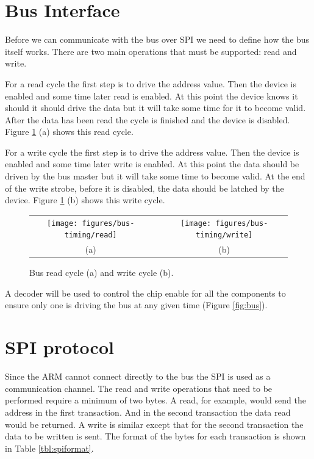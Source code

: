 \documentclass{article}
\begin{document}

\section{Bus Interface}
\label{sec:bus}

Before we can communicate with the bus over SPI we need
to define how the bus itself works.
There are two main operations that must be supported: read and write.

For a read cycle the first step is to drive the address value.
Then the device is enabled and some time later read is enabled.
At this point the device knows it should it should drive the
data but it will take some time for it to become valid.
After the data has been read the cycle is finished and the device is disabled.
Figure \ref{fig:bus_cycle} (a) shows this read cycle.

For a write cycle the first step is to drive the address value.
Then the device is enabled and some time later write is enabled.
At this point the data should be driven by the bus master
but it will take some time to become valid.
At the end of the write strobe, before it is disabled,
the data should be latched by the device.
Figure \ref{fig:bus_cycle} (b) shows this write cycle.

\begin{figure}
\center

\begin{tabular}{ccc}
\texttt{[image: figures/bus-timing/read]} & \quad &
\texttt{[image: figures/bus-timing/write]} \\
(a) && (b) 
\end{tabular}

\caption{Bus read cycle (a) and write cycle (b).}
\label{fig:bus_cycle}
\end{figure}

A decoder will be used to control the chip enable for all the components
to ensure only one is driving the bus at any given time (Figure \ref{fig:bus}).


\section{SPI protocol}

Since the ARM cannot connect directly to the bus the SPI
is used as a communication channel.
The read and write operations that need to be performed
require a minimum of two bytes.
A read, for example, would send the address in the first transaction.
And in the second transaction the data read would be returned.
A write is similar except that for the second transaction the
data to be written is sent.
The format of the bytes for each transaction is shown in Table \ref{tbl:spiformat}.
\end{document}
